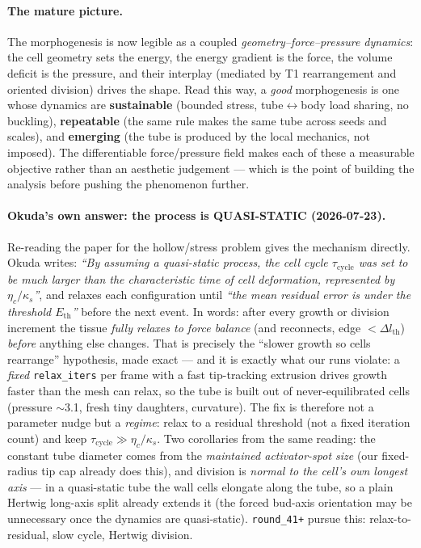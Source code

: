 \documentclass[11pt]{article}
\begin{document}
\paragraph{The mature picture.} The morphogenesis is now legible as a coupled \emph{geometry--force--pressure
dynamics}: the cell geometry sets the energy, the energy gradient is the force, the volume deficit is the
pressure, and their interplay (mediated by T1 rearrangement and oriented division) drives the shape. Read
this way, a \emph{good} morphogenesis is one whose dynamics are \textbf{sustainable} (bounded stress,
tube$\leftrightarrow$body load sharing, no buckling), \textbf{repeatable} (the same rule makes the same tube
across seeds and scales), and \textbf{emerging} (the tube is produced by the local mechanics, not imposed).
The differentiable force/pressure field makes each of these a measurable objective rather than an aesthetic
judgement --- which is the point of building the analysis before pushing the phenomenon further.

\paragraph{Okuda's own answer: the process is QUASI-STATIC (2026-07-23).} Re-reading the paper for the
hollow/stress problem gives the mechanism directly. Okuda writes: \emph{``By assuming a quasi-static process,
the cell cycle $\tau_{\text{cycle}}$ was set to be much larger than the characteristic time of cell
deformation, represented by $\eta_c/\kappa_s$''}, and relaxes each configuration until \emph{``the mean
residual error is under the threshold $E_{\text{th}}$''} before the next event. In words: after every growth
or division increment the tissue \emph{fully relaxes to force balance} (and reconnects, edge $<\Delta l_{\text{th}}$)
\emph{before} anything else changes. That is precisely the ``slower growth so cells rearrange'' hypothesis,
made exact --- and it is exactly what our runs violate: a \emph{fixed} \texttt{relax\_iters} per frame with a
fast tip-tracking extrusion drives growth faster than the mesh can relax, so the tube is built out of
never-equilibrated cells (pressure $\sim$3.1, fresh tiny daughters, curvature). The fix is therefore not a
parameter nudge but a \emph{regime}: relax to a residual threshold (not a fixed iteration count) and keep
$\tau_{\text{cycle}}\gg\eta_c/\kappa_s$. Two corollaries from the same reading: the constant tube diameter
comes from the \emph{maintained activator-spot size} (our fixed-radius tip cap already does this), and
division is \emph{normal to the cell's own longest axis} --- in a quasi-static tube the wall cells elongate
along the tube, so a plain Hertwig long-axis split already extends it (the forced bud-axis orientation may be
unnecessary once the dynamics are quasi-static). \texttt{round\_41+} pursue this: relax-to-residual, slow
cycle, Hertwig division.
\end{document}
